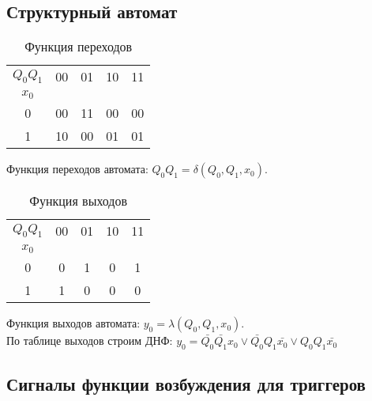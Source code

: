 \documentclass[a4paper,10pt]{article}
\begin{document}

    \subsection*{Структурный автомат}
        \begin{table}[h!]
        \center
        \begin{tabular}{|c|c|c|c|c|}
            \hline
             $Q_0Q_1$ & 00 & 01 & 10 & 11 \\ 
             $x_0$    &    &    &    &    \\ \hline
                 0    & 00 & 11 & 00 & 00 \\ \hline 
                 1    & 10 & 00 & 01 & 01 \\ \hline
        \end{tabular}
        \caption{Функция переходов}
    \end{table}
    Функция переходов автомата: $Q_0Q_1 = \delta(Q_0,Q_1,x_0)$.

    \begin{table}[h!]
        \center
        \begin{tabular}{|c|c|c|c|c|}
            \hline
              $Q_0Q_1$& 00 & 01 & 10 & 11 \\ 
              $x_0$   &    &    &    &    \\ \hline
                 0    &  0 &  1 & 0  & 1  \\ \hline 
                 1    &  1 &  0 & 0  & 0  \\ \hline
        \end{tabular}
        \caption{Функция выходов}
    \end{table} 
    Функция выходов автомата: $y_0 = \lambda(Q_0,Q_1,x_0)$. \\

    По таблице выходов строим ДНФ:
    $y_0 = \bar{Q_0} \bar{Q_1} x_0 \lor \bar{Q_0} Q_1 \bar{x_0} \lor Q_0 Q_1 \bar{x_0}$

    \subsection*{Сигналы функции возбуждения для триггеров}
\end{document}
